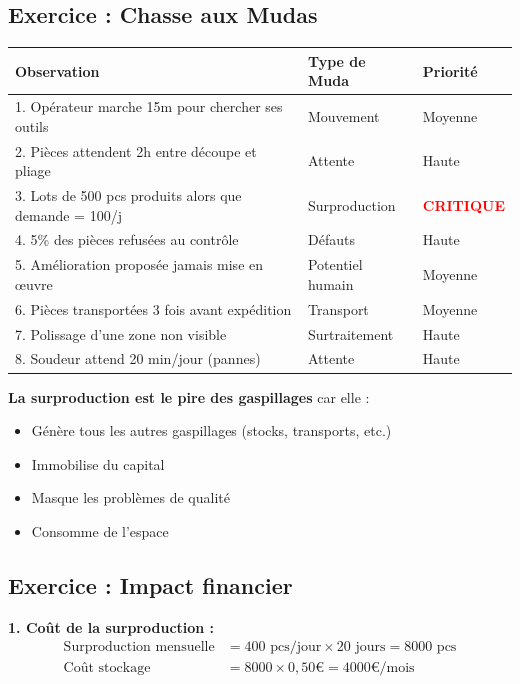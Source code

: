 \documentclass[12pt,a4paper]{article}
\begin{document}
\subsection{Exercice : Chasse aux Mudas}

\begin{center}
\renewcommand{\arraystretch}{1.5}
\begin{tabular}{|p{8cm}|p{3cm}|p{2cm}|}
\hline
\textbf{Observation} & \textbf{Type de Muda} & \textbf{Priorité} \\
\hline
1. Opérateur marche 15m pour chercher ses outils & Mouvement & Moyenne \\
\hline
2. Pièces attendent 2h entre découpe et pliage & Attente & Haute \\
\hline
3. Lots de 500 pcs produits alors que demande = 100/j & Surproduction & \textcolor{red}{\textbf{CRITIQUE}} \\
\hline
4. 5\% des pièces refusées au contrôle & Défauts & Haute \\
\hline
5. Amélioration proposée jamais mise en œuvre & Potentiel humain & Moyenne \\
\hline
6. Pièces transportées 3 fois avant expédition & Transport & Moyenne \\
\hline
7. Polissage d'une zone non visible & Surtraitement & Haute \\
\hline
8. Soudeur attend 20 min/jour (pannes) & Attente & Haute \\
\hline
\end{tabular}
\end{center}

\begin{tcolorbox}[pedagogique]
\textbf{La surproduction est le pire des gaspillages} car elle :
\begin{itemize}
    \item Génère tous les autres gaspillages (stocks, transports, etc.)
    \item Immobilise du capital
    \item Masque les problèmes de qualité
    \item Consomme de l'espace
\end{itemize}
\end{tcolorbox}

\subsection{Exercice : Impact financier}

\textbf{1. Coût de la surproduction :}
\begin{align*}
    \text{Surproduction mensuelle} &= 400 \text{ pcs/jour} \times 20 \text{ jours} = 8000 \text{ pcs} \\
    \text{Coût stockage} &= 8000 \times 0{,}50\text{€} = \boxed{4000\text{€/mois}}
\end{align*}
\end{document}
